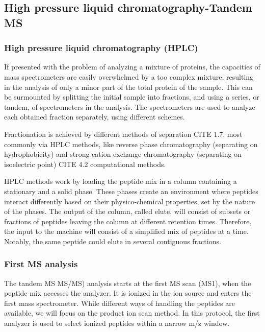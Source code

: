 \documentclass[11pt, a4paper]{report}
\begin{document}
\subsection{High pressure liquid chromatography-Tandem MS}
\label{subsec:ms2}

\subsubsection{High pressure liquid chromatography (HPLC)}

If presented with the problem of analyzing a mixture of proteins, the capacities of mass spectrometers are easily overwhelmed by a too complex mixture, resulting in the analysis of only a minor part of the total protein  of the sample. This can be surmounted by splitting the initial sample into fractions, and using a series, or tandem, of spectrometers in the analysis. The spectrometers are used to analyze each obtained fraction separately, using different schemes.

Fractionation is achieved by different methods of separation CITE 1.7, most commonly via \ac{HPLC} methods, like reverse phase chromatography (separating on hydrophobicity) and strong cation exchange chromatography (separating on isoelectric point)  CITE 4.2 computational methods.

\ac{HPLC} methods work by loading the peptide mix in a column containing a stationary and a solid phase. These phases create an environment where peptides interact differently based on their physico-chemical properties, set by the nature of the phases. The output of the column, called elute, will consist of subsets or fractions of peptides leaving the column at different retention times. Therefore, the input to the machine will consist of a simplified mix of peptides at a time. Notably, the same peptide could elute in several contiguous fractions.


\subsubsection{First MS analysis}

The tandem MS \ac{MS/MS}) analysis starts at the first \ac{MS} scan (\ac{MS1}), when the peptide mix accesses the analyzer. It is ionized in the ion source and enters the first mass spectrometer. While different ways of handling the peptides are available, we will focus on the product ion scan method. In this protocol, the first analyzer is used to select ionized peptides within a narrow m/z window.
\end{document}
